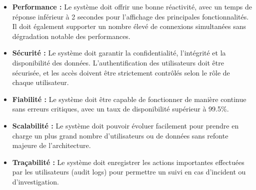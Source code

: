 \begin{itemize}
    \item \textbf{Performance :} Le système doit offrir une bonne réactivité, avec un temps de réponse inférieur à 2 secondes pour l'affichage des principales fonctionnalités. Il doit également supporter un nombre élevé de connexions simultanées sans dégradation notable des performances.
    
    \item \textbf{Sécurité :} Le système doit garantir la confidentialité, l’intégrité et la disponibilité des données. L’authentification des utilisateurs doit être sécurisée, et les accès doivent être strictement contrôlés selon le rôle de chaque utilisateur.
    
    \item \textbf{Fiabilité :} Le système doit être capable de fonctionner de manière continue sans erreurs critiques, avec un taux de disponibilité supérieur à 99.5\%.

    \item \textbf{Scalabilité :} Le système doit pouvoir évoluer facilement pour prendre en charge un plus grand nombre d’utilisateurs ou de données sans refonte majeure de l’architecture.
    
    \item \textbf{Traçabilité :} Le système doit enregistrer les actions importantes effectuées par les utilisateurs (audit logs) pour permettre un suivi en cas d’incident ou d’investigation.
\end{itemize}
\newpage
